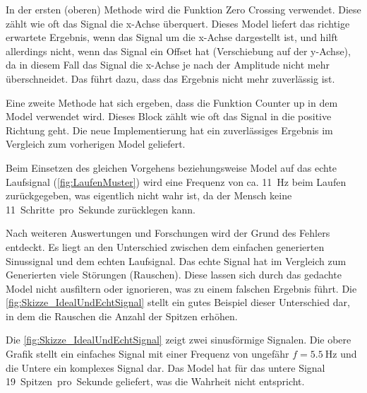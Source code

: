 In der ersten (oberen) Methode wird die Funktion \glqq Zero Crossing\grqq{} verwendet. Diese zählt wie oft das Signal die x-Achse überquert. Dieses Model liefert das richtige erwartete Ergebnis, wenn das Signal um die x-Achse dargestellt ist, und hilft allerdings nicht, wenn das Signal ein Offset hat (Verschiebung auf der y-Achse), da in diesem Fall das Signal die x-Achse je nach der Amplitude nicht mehr überschneidet. Das führt dazu, dass das Ergebnis nicht mehr zuverlässig ist.

Eine zweite Methode hat sich ergeben, dass die Funktion \glqq Counter up\grqq{} in dem Model verwendet wird. Dieses Block zählt wie oft das Signal in die positive Richtung geht. Die neue Implementierung hat ein zuverlässiges Ergebnis im Vergleich zum vorherigen Model geliefert.

Beim Einsetzen des gleichen Vorgehens beziehungsweise Model auf das echte Laufsignal (\autoref{fig:LaufenMuster}) wird eine Frequenz von ca. \SI{11}{\hertz} beim Laufen zurückgegeben, was eigentlich nicht wahr ist, da der Mensch keine \SI{11}{Schritte pro Sekunde} zurücklegen kann.

Nach weiteren Auswertungen und Forschungen wird der Grund des Fehlers entdeckt. Es liegt an den Unterschied zwischen dem einfachen generierten Sinussignal und dem echten Laufsignal. Das echte Signal hat im Vergleich zum Generierten viele Störungen (Rauschen). Diese lassen sich durch das gedachte Model nicht ausfiltern oder ignorieren, was zu einem falschen Ergebnis führt. Die \autoref{fig:Skizze_IdealUndEchtSignal} stellt ein gutes Beispiel dieser Unterschied dar, in dem die Rauschen die Anzahl der Spitzen erhöhen.

Die \autoref{fig:Skizze_IdealUndEchtSignal} zeigt zwei sinusförmige Signalen. Die obere Grafik stellt ein einfaches Signal mit einer Frequenz von ungefähr $f = \SI{5,5}{\hertz}$ und die Untere ein komplexes Signal dar.
Das Model hat für das untere Signal \SI{19}{Spitzen pro Sekunde} geliefert, was die Wahrheit nicht entspricht.


